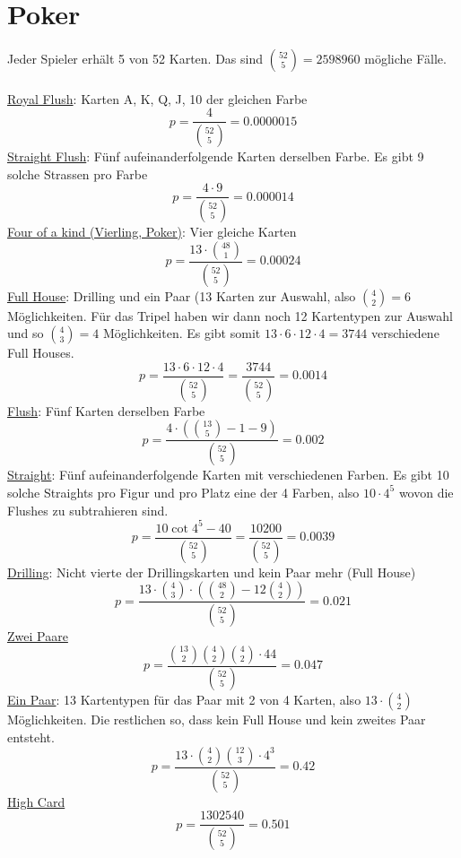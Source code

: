\documentclass{article}
\begin{document}
\section{Poker}
Jeder Spieler erhält 5 von 52 Karten. Das sind $\binom{52}{5} = 2 598 960$ mögliche Fälle.\\\\
\underline{Royal Flush}: Karten A, K, Q, J, 10 der gleichen Farbe
\begin{equation}
p = \frac{4}{\binom{52}{5}} = 0.0000015
\end{equation}
\underline{Straight Flush}: Fünf aufeinanderfolgende Karten derselben Farbe. Es gibt 9 solche Strassen pro Farbe
\begin{equation}
p = \frac{4 \cdot 9}{\binom{52}{5}} = 0.000014
\end{equation}
\underline{Four of a kind (Vierling, Poker)}: Vier gleiche Karten
\begin{equation}
p = \frac{13 \cdot \binom{48}{1}}{\binom{52}{5}} = 0.00024
\end{equation}
\underline{Full House}: Drilling und ein Paar (13 Karten zur Auswahl, also $\binom{4}{2} = 6$ Möglichkeiten. Für das Tripel haben wir dann noch 12 Kartentypen zur Auswahl und so $\binom{4}{3} = 4$ Möglichkeiten. Es gibt somit $13 \cdot 6 \cdot 12 \cdot 4 = 3744$ verschiedene Full Houses.
\begin{equation}
p = \frac{13 \cdot 6 \cdot 12 \cdot 4}{\binom{52}{5}} = \frac{3744}{\binom{52}{5}} = 0.0014
\end{equation}
\underline{Flush}: Fünf Karten derselben Farbe
\begin{equation}
p = \frac{4 \cdot (\binom{13}{5} - 1 - 9)}{\binom{52}{5}} = 0.002
\end{equation}
\underline{Straight}: Fünf aufeinanderfolgende Karten mit verschiedenen Farben. Es gibt 10 solche Straights pro Figur und pro Platz eine der 4 Farben, also $10 \cdot 4^5$ wovon die Flushes zu subtrahieren sind.
\begin{equation}
p = \frac{10 \cot 4^5 - 40}{\binom{52}{5}} = \frac{10 200}{\binom{52}{5}} = 0.0039
\end{equation}
\underline{Drilling}: Nicht vierte der Drillingskarten und kein Paar mehr (Full House)
\begin{equation}
p = \frac{13 \cdot \binom{4}{3} \cdot (\binom{48}{2} - 12 \binom{4}{2})}{\binom{52}{5}} = 0.021
\end{equation}
\underline{Zwei Paare}
\begin{equation}
p = \frac{\binom{13}{2} \binom{4}{2} \binom{4}{2} \cdot 44}{\binom{52}{5}} = 0.047
\end{equation}
\underline{Ein Paar}: 13 Kartentypen für das Paar mit 2 von 4 Karten, also $13 \cdot \binom{4}{2}$ Möglichkeiten. Die restlichen so, dass kein Full House und kein zweites Paar entsteht.
\begin{equation}
p = \frac{13 \cdot \binom{4}{2} \binom{12}{3} \cdot 4^3}{\binom{52}{5}} = 0.42
\end{equation}
\underline{High Card}
\begin{equation}
p = \frac{1 302 540}{\binom{52}{5}} = 0.501
\end{equation}
\end{document}
